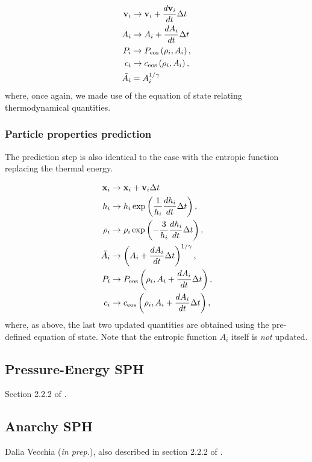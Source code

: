 \begin{align}
  \vec{v}_i &\rightarrow \vec{v}_i + \frac{d\vec{v}_i}{dt} \Delta t  \label{eq:sph:pe:kick_v}\\
  A_i &\rightarrow A_i + \frac{dA_i}{dt} \Delta t \label{eq:sph:pe:kick_A}\\
  P_i &\rightarrow P_{\rm eos}\left(\rho_i, A_i\right) \label{eq:sph:pe:kick_P}, \\
  c_i &\rightarrow c_{\rm eos}\left(\rho_i,
  A_i\right) \label{eq:sph:pe:kick_c}, \\
  \tilde A_i &= A_i^{1/\gamma}
\end{align}
where, once again, we made use of the equation of state relating
thermodynamical quantities.


\subsubsection{Particle properties prediction}

The prediction step is also identical to the \MinimalSPH case with the
entropic function replacing the thermal energy.

\begin{align}
  \vec{x}_i &\rightarrow \vec{x}_i + \vec{v}_i \Delta t  \label{eq:sph:pe:drift_x} \\
  h_i &\rightarrow h_i \exp\left(\frac{1}{h_i} \frac{dh_i}{dt}
  \Delta t\right), \label{eq:sph:pe:drift_h}\\
  \rho_i &\rightarrow \rho_i \exp\left(-\frac{3}{h_i} \frac{dh_i}{dt}
  \Delta t\right), \label{eq:sph:pe:drift_rho} \\
  \tilde A_i &\rightarrow \left(A_i + \frac{dA_i}{dt}
  \Delta t\right)^{1/\gamma} \label{eq:sph:pe:drift_A_tilde}, \\
  P_i &\rightarrow P_{\rm eos}\left(\rho_i, A_i + \frac{dA_i}{dt} \Delta t\right), \label{eq:sph:pe:drift_P}\\
  c_i &\rightarrow c_{\rm eos}\left(\rho_i, A_i + \frac{dA_i}{dt}
  \Delta t\right) \label{eq:sph:pe:drift_c}, 
\end{align}
where, as above, the last two updated quantities are obtained using
the pre-defined equation of state. Note that the entropic function $A_i$
itself is \emph{not} updated.

\subsection{Pressure-Energy SPH}
\label{sec:sph:pu}

Section 2.2.2 of \cite{Hopkins2013}.\\ \tbd
\subsection{Anarchy SPH}
Dalla Vecchia (\textit{in prep.}), also described in section 2.2.2 of
\cite{Schaller2015}.\\
\label{sec:sph:anarchy}
\tbd 
